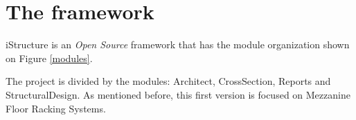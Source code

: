 \section{The framework}

iStructure is an \textit{Open Source} framework that has the module organization shown on Figure \ref{modules}.



The project is divided by the modules: Architect, CrossSection, Reports and StructuralDesign. As mentioned before, this first version is focused on Mezzanine Floor Racking Systems.

\vspace{4cm}